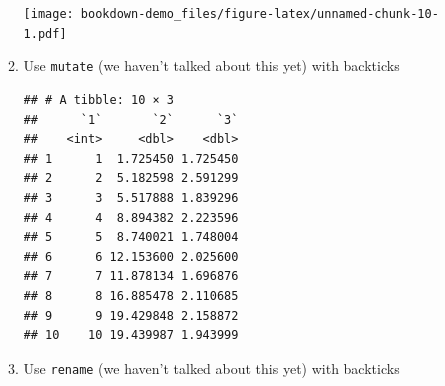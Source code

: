 \documentclass[]{book}
\newenvironment{Shaded}{\begin{snugshade}}{\end{snugshade}}
\newcommand{\KeywordTok}[1]{\textcolor[rgb]{0.13,0.29,0.53}{\textbf{{#1}}}}
\newcommand{\DataTypeTok}[1]{\textcolor[rgb]{0.13,0.29,0.53}{{#1}}}
\newcommand{\StringTok}[1]{\textcolor[rgb]{0.31,0.60,0.02}{{#1}}}
\newcommand{\NormalTok}[1]{{#1}}
\theoremstyle{definition}
\theoremstyle{definition}
\theoremstyle{remark}
\begin{document}
\begin{enumerate}
\begin{enumerate}
\begin{Shaded}
\end{Shaded}

    \texttt{[image: bookdown-demo\_files/figure-latex/unnamed-chunk-10-1.pdf]}
  \item
    Use \texttt{mutate} (we haven't talked about this yet) with
    backticks

\begin{Shaded}
\end{Shaded}

\begin{verbatim}
## # A tibble: 10 × 3
##      `1`       `2`      `3`
##    <int>     <dbl>    <dbl>
## 1      1  1.725450 1.725450
## 2      2  5.182598 2.591299
## 3      3  5.517888 1.839296
## 4      4  8.894382 2.223596
## 5      5  8.740021 1.748004
## 6      6 12.153600 2.025600
## 7      7 11.878134 1.696876
## 8      8 16.885478 2.110685
## 9      9 19.429848 2.158872
## 10    10 19.439987 1.943999
\end{verbatim}
  \item
    Use \texttt{rename} (we haven't talked about this yet) with
    backticks

\begin{Shaded}
\end{Shaded}


\end{enumerate}
\end{enumerate}
\end{document}
